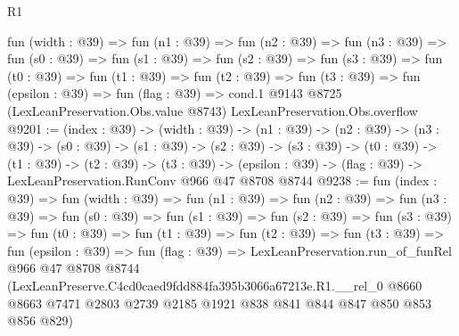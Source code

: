 \begin{lexlean}{R1}
\begin{coremodule}
  fun (width : @39) =>
  fun (n1 : @39) =>
  fun (n2 : @39) =>
  fun (n3 : @39) =>
  fun (s0 : @39) =>
  fun (s1 : @39) =>
  fun (s2 : @39) =>
  fun (s3 : @39) =>
  fun (t0 : @39) =>
  fun (t1 : @39) =>
  fun (t2 : @39) =>
  fun (t3 : @39) =>
  fun (epsilon : @39) =>
  fun (flag : @39) =>
  cond.{1} @9143 @8725 (LexLeanPreservation.Obs.value @8743) LexLeanPreservation.Obs.overflow
@9201 := (index : @39) ->
  (width : @39) ->
  (n1 : @39) ->
  (n2 : @39) ->
  (n3 : @39) ->
  (s0 : @39) ->
  (s1 : @39) ->
  (s2 : @39) ->
  (s3 : @39) ->
  (t0 : @39) ->
  (t1 : @39) ->
  (t2 : @39) ->
  (t3 : @39) -> (epsilon : @39) -> (flag : @39) -> LexLeanPreservation.RunConv @966 @47 @8708 @8744
@9238 := fun (index : @39) =>
  fun (width : @39) =>
  fun (n1 : @39) =>
  fun (n2 : @39) =>
  fun (n3 : @39) =>
  fun (s0 : @39) =>
  fun (s1 : @39) =>
  fun (s2 : @39) =>
  fun (s3 : @39) =>
  fun (t0 : @39) =>
  fun (t1 : @39) =>
  fun (t2 : @39) =>
  fun (t3 : @39) =>
  fun (epsilon : @39) =>
  fun (flag : @39) =>
  LexLeanPreservation.run_of_funRel
    @966
    @47
    @8708
    @8744
    (LexLeanPreserve.C4cd0caed9fdd884fa395b3066a67213e.R1.__rel_0
      @8660
      @8663
      @7471
      @2803
      @2739
      @2185
      @1921
      @838
      @841
      @844
      @847
      @850
      @853
      @856
      @829)
\end{coremodule}
\end{lexlean}
